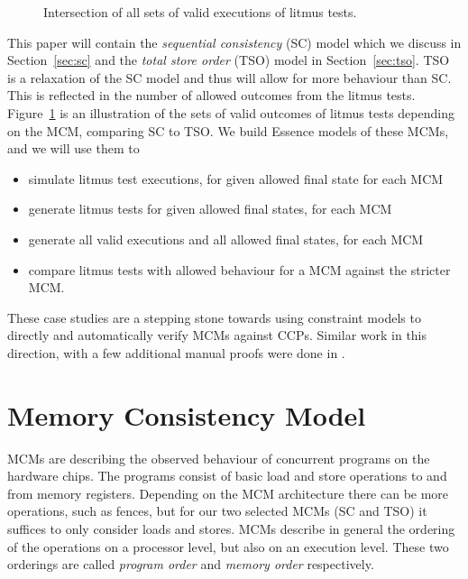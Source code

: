 \documentclass[runningheads]{llncs}
\begin{document}
\begin{figure}
    \begin{center}
    \caption{Intersection of all sets of valid executions of litmus tests.}
    \label{fig:venn}
    \end{center}
\end{figure}


This paper will contain the \emph{sequential consistency} (SC) model which we discuss in Section~\ref{sec:sc} and the \emph{total store order} (TSO) model in Section~\ref{sec:tso}.
TSO is a relaxation of the SC model and thus will allow for more behaviour than SC.
This is reflected in the number of allowed outcomes from the litmus tests.
Figure~\ref{fig:venn} is an illustration of the sets of valid outcomes of litmus tests depending on the MCM, comparing SC to TSO.
We build Essence models of these MCMs, and we will use them to
\begin{itemize}
    \item simulate litmus test executions, for given allowed final state for each MCM
    \item generate litmus tests for given allowed final states, for each MCM
    \item generate all valid executions and all allowed final states, for each MCM
    \item compare litmus tests with allowed behaviour for a MCM against the stricter MCM.
\end{itemize}


These case studies are a stepping stone towards using constraint models to directly and automatically verify MCMs against CCPs.
Similar work in this direction, with a few additional manual proofs were done in \cite{banks2017verification}.


\section{Memory Consistency Model}
MCMs are describing the observed behaviour of concurrent programs on the hardware chips.
The programs consist of basic load and store operations to and from memory registers.
Depending on the MCM architecture there can be more operations, such as fences, but for our two selected MCMs (SC and TSO) it suffices to only consider loads and stores.
MCMs describe in general the ordering of the operations on a processor level, but also on an execution level.
These two orderings are called \emph{program order} and \emph{memory order} respectively.
\end{document}

